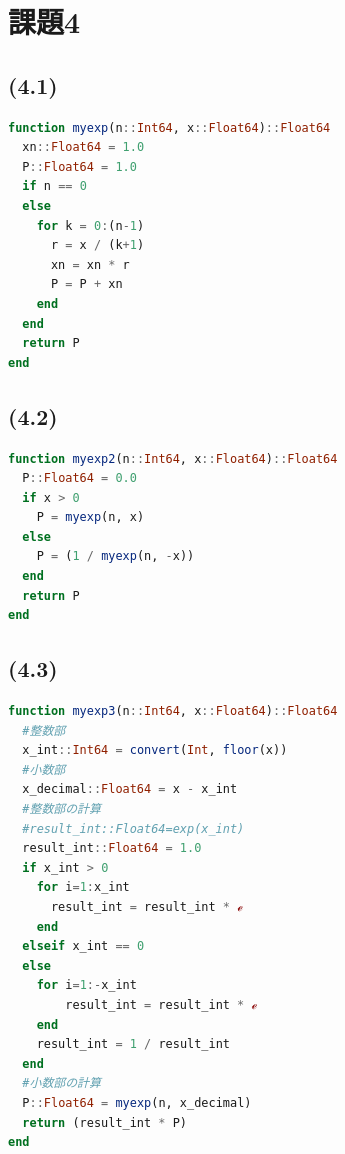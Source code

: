 \documentclass[uplatex, dvipdfmx, a4j,11pt]{jsarticle}
\begin{document}
\section*{課題4}
\subsection*{(4.1)}
\begin{lstlisting}[title={(4.1)}, label=code:in, language=Julia]
function myexp(n::Int64, x::Float64)::Float64
  xn::Float64 = 1.0
  P::Float64 = 1.0
  if n == 0
  else
    for k = 0:(n-1)
      r = x / (k+1)
      xn = xn * r
      P = P + xn
    end
  end
  return P
end
\end{lstlisting}
\subsection*{(4.2)}
\begin{lstlisting}[title={(4.2)}, label=code:in, language=Julia]
function myexp2(n::Int64, x::Float64)::Float64
  P::Float64 = 0.0
  if x > 0
    P = myexp(n, x)
  else
    P = (1 / myexp(n, -x))
  end
  return P
end
\end{lstlisting}
\subsection*{(4.3)}
\begin{lstlisting}[title={(4.2)}, label=code:in, language=Julia]
function myexp3(n::Int64, x::Float64)::Float64
  #整数部
  x_int::Int64 = convert(Int, floor(x))
  #小数部
  x_decimal::Float64 = x - x_int
  #整数部の計算
  #result_int::Float64=exp(x_int)
  result_int::Float64 = 1.0
  if x_int > 0
    for i=1:x_int
      result_int = result_int * ℯ
    end
  elseif x_int == 0
  else
    for i=1:-x_int
        result_int = result_int * ℯ
    end
    result_int = 1 / result_int
  end
  #小数部の計算
  P::Float64 = myexp(n, x_decimal)
  return (result_int * P)
end
\end{lstlisting}

\newpage
\end{document}
